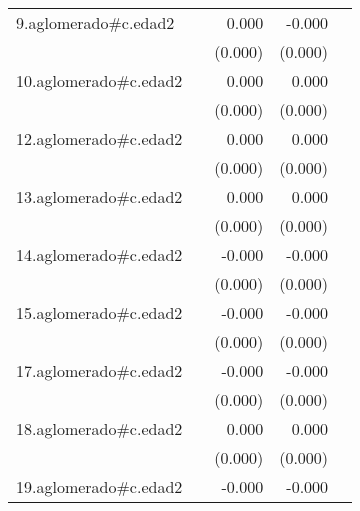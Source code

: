 {\begin{longtable}{l*{4}{D{.}{.}{-1}}}
\addlinespace
9.aglomerado#c.edad2&                     &       0.000         &      -0.000         &                     \\
            &                     &     (0.000)         &     (0.000)         &                     \\
\addlinespace
10.aglomerado#c.edad2&                     &       0.000         &       0.000         &                     \\
            &                     &     (0.000)         &     (0.000)         &                     \\
\addlinespace
12.aglomerado#c.edad2&                     &       0.000\sym{**} &       0.000\sym{*}  &                     \\
            &                     &     (0.000)         &     (0.000)         &                     \\
\addlinespace
13.aglomerado#c.edad2&                     &       0.000         &       0.000         &                     \\
            &                     &     (0.000)         &     (0.000)         &                     \\
\addlinespace
14.aglomerado#c.edad2&                     &      -0.000         &      -0.000         &                     \\
            &                     &     (0.000)         &     (0.000)         &                     \\
\addlinespace
15.aglomerado#c.edad2&                     &      -0.000         &      -0.000\sym{*}  &                     \\
            &                     &     (0.000)         &     (0.000)         &                     \\
\addlinespace
17.aglomerado#c.edad2&                     &      -0.000         &      -0.000         &                     \\
            &                     &     (0.000)         &     (0.000)         &                     \\
\addlinespace
18.aglomerado#c.edad2&                     &       0.000         &       0.000         &                     \\
            &                     &     (0.000)         &     (0.000)         &                     \\
\addlinespace
19.aglomerado#c.edad2&                     &      -0.000         &      -0.000\sym{*}  &                     \\

\end{longtable}}
